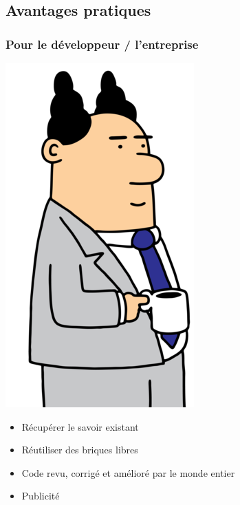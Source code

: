\documentclass[english]{beamer}
\begin{document}
\subsection{Avantages pratiques}
\begin{frame}
  \frametitle{Pour le développeur / l'entreprise}
  \vspace{-2em}
  \begin{center}
    \includegraphics[scale=0.2]{boss.png}
  \end{center}
  \vspace{-1em}
  \begin{itemize}
  \item <2-> Récupérer le savoir existant
  \item <3-> Réutiliser des briques libres
  \item <4-> Code revu, corrigé et amélioré par le monde entier
  \item <5-> Publicité
  \end{itemize}
\end{frame}
\end{document}

